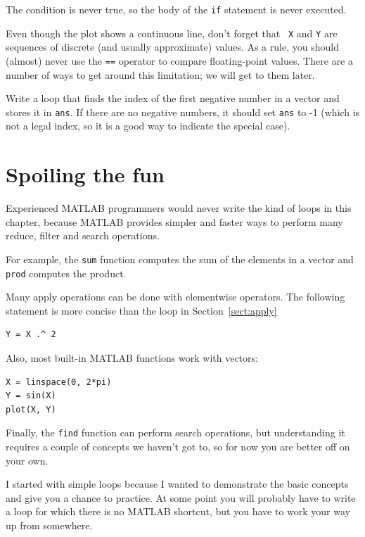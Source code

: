 \documentclass[
]{book}
\begin{document}
The condition is never true, so the body of the {\tt if} statement
is never executed.

Even though the plot shows a continuous line, don't forget that {\tt
X} and {\tt Y} are sequences of discrete (and usually approximate)
values.  As a rule, you should (almost) never use the {\tt ==}
operator to compare floating-point values.  There are a number of ways
to get around this limitation; we will get to them later.

\begin{ex}
Write a loop that finds the index of the first
negative number in a vector and stores it in {\tt ans}.  If there are
no negative numbers, it should set {\tt ans} to -1 (which is not
a legal index, so it is a good way to indicate the special case).
\end{ex}



\section{Spoiling the fun}

Experienced MATLAB programmers would never write the kind of loops
in this chapter, because MATLAB provides simpler and faster ways to
perform many reduce, filter and search operations.

For example, the {\tt sum} function computes the sum of the elements
in a vector and {\tt prod} computes the product.

Many apply operations can be done with elementwise operators.  The
following statement is more concise than the loop in
Section~\ref{sect:apply}

\begin{verbatim}
Y = X .^ 2
\end{verbatim}

Also, most built-in MATLAB functions work with vectors:

\begin{verbatim}
X = linspace(0, 2*pi)
Y = sin(X)
plot(X, Y)
\end{verbatim}

Finally, the {\tt find} function can perform search operations, but
understanding it requires a couple of concepts we haven't got to, so
for now you are better off on your own.

I started with simple loops because I wanted to demonstrate the basic
concepts and give you a chance to practice.  At some point you will
probably have to write a loop for which there is no
MATLAB shortcut, but you have to work your way up from somewhere.
\end{document}

